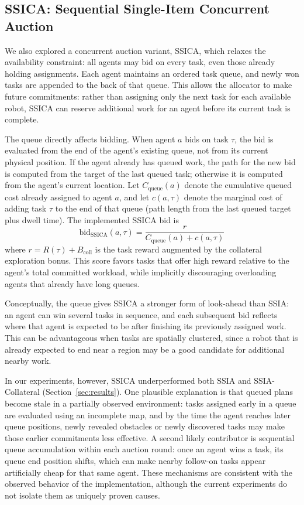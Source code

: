 \documentclass[conference]{IEEEtran}
\begin{document}
\subsection{SSICA: Sequential Single-Item Concurrent Auction}

We also explored a concurrent auction variant, SSICA, which relaxes the availability constraint: all agents may bid on every task, even those already holding assignments. Each agent maintains an ordered task queue, and newly won tasks are appended to the back of that queue. This allows the allocator to make future commitments: rather than assigning only the next task for each available robot, SSICA can reserve additional work for an agent before its current task is complete.

The queue directly affects bidding. When agent $a$ bids on task $\tau$, the bid is evaluated from the end of the agent's existing queue, not from its current physical position. If the agent already has queued work, the path for the new bid is computed from the target of the last queued task; otherwise it is computed from the agent's current location. Let $C_{\text{queue}}(a)$ denote the cumulative queued cost already assigned to agent $a$, and let $c(a,\tau)$ denote the marginal cost of adding task $\tau$ to the end of that queue (path length from the last queued target plus dwell time). The implemented SSICA bid is
\begin{equation}
    \text{bid}_{\text{SSICA}}(a, \tau) = \frac{r}{C_{\text{queue}}(a) + c(a, \tau)}
    \label{eq:bid_ssica}
\end{equation}
where $r = R(\tau) + B_{\text{coll}}$ is the task reward augmented by the collateral exploration bonus. This score favors tasks that offer high reward relative to the agent's total committed workload, while implicitly discouraging overloading agents that already have long queues.

Conceptually, the queue gives SSICA a stronger form of look-ahead than SSIA: an agent can win several tasks in sequence, and each subsequent bid reflects where that agent is expected to be after finishing its previously assigned work. This can be advantageous when tasks are spatially clustered, since a robot that is already expected to end near a region may be a good candidate for additional nearby work.

In our experiments, however, SSICA underperformed both SSIA and SSIA-Collateral (Section~\ref{sec:results}). One plausible explanation is that queued plans become stale in a partially observed environment: tasks assigned early in a queue are evaluated using an incomplete map, and by the time the agent reaches later queue positions, newly revealed obstacles or newly discovered tasks may make those earlier commitments less effective. A second likely contributor is sequential queue accumulation within each auction round: once an agent wins a task, its queue end position shifts, which can make nearby follow-on tasks appear artificially cheap for that same agent. These mechanisms are consistent with the observed behavior of the implementation, although the current experiments do not isolate them as uniquely proven causes.
\end{document}
